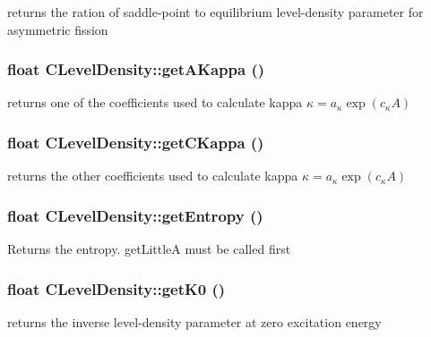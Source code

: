 returns the ration of saddle-point to equilibrium level-density parameter for asymmetric fission 
\subsubsection{\setlength{\rightskip}{0pt plus 5cm}float CLevel\-Density::get\-AKappa ()\hspace{0.3cm}{\tt  [static]}}\label{classCLevelDensity_d4b025eeaf50b2609a5f4a1aa2e1c695}


returns one of the coefficients used to calculate kappa $ \kappa = a_{\kappa} \exp\left(c_{\kappa} A\right) $ 
\subsubsection{\setlength{\rightskip}{0pt plus 5cm}float CLevel\-Density::get\-CKappa ()\hspace{0.3cm}{\tt  [static]}}\label{classCLevelDensity_d761161ac6272d6efb58796825fa7000}


returns the other coefficients used to calculate kappa $ \kappa = a_{\kappa} \exp\left(c_{\kappa} A\right) $ 
\subsubsection{\setlength{\rightskip}{0pt plus 5cm}float CLevel\-Density::get\-Entropy ()}\label{classCLevelDensity_f3c8dae34c2de62646d0061cbb6bbe82}


Returns the entropy. get\-Little\-A must be called first 
\subsubsection{\setlength{\rightskip}{0pt plus 5cm}float CLevel\-Density::get\-K0 ()\hspace{0.3cm}{\tt  [static]}}\label{classCLevelDensity_e5bec4da4e010b19a0d092056fecaf7f}


returns the inverse level-density parameter at zero excitation energy 
